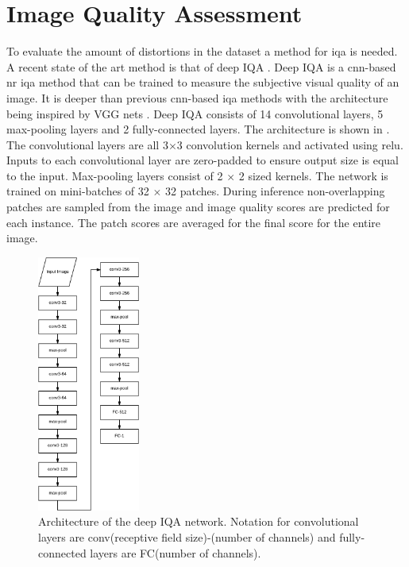\section{Image Quality Assessment}\label{sec:iqaimp}
To evaluate the amount of distortions in the dataset a method for \gls{iqa} is needed. A recent state of the art method is that of deep IQA \cite{deepiqa}. Deep IQA is a \gls{cnn}-based \gls{nr} \gls{iqa} method that can be trained to measure the subjective visual quality of an image. It is deeper than previous \gls{cnn}-based \gls{iqa} methods with the architecture being inspired by VGG nets \cite{vgg16}. Deep IQA consists of 14 convolutional layers, 5 max-pooling layers and 2 fully-connected layers. The architecture is shown in . The convolutional layers are all 3$\times$3 convolution kernels and activated using \gls{relu}. Inputs to each convolutional layer are zero-padded to ensure output size is equal to the input. Max-pooling layers consist of 2 $\times$ 2 sized kernels. The network is trained on mini-batches of 32 $\times$ 32 patches. During inference non-overlapping patches are sampled from the image and image quality scores are predicted for each instance. The patch scores are averaged for the final score for the entire image. 

\begin{figure}[H]
  \centering
    \includegraphics[width=0.3\textwidth]{Figs/Implementation/deepiqa_arch.pdf}
      \caption{Architecture of the deep IQA network. Notation for convolutional layers are conv(receptive field size)-(number of channels) and fully-connected layers are FC(number of channels).}
    \label{fig:deepiqa_arch}
\end{figure}

